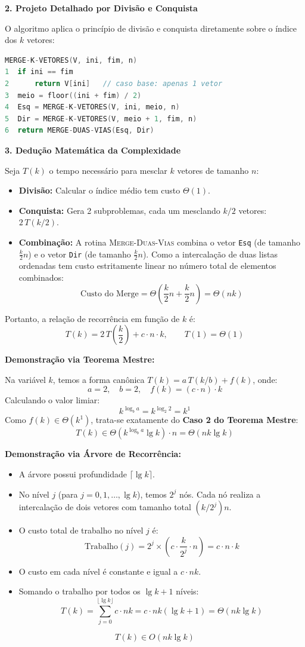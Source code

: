 \documentclass[11pt,a4paper]{article}
\newcommand{\res}[1]{\[\boxed{#1}\]}
\newcommand{\topico}[1]{\par\medskip\textbf{\color{azul}#1}\par}
\newcommand{\subtopico}[1]{\par\smallskip\textbf{#1}\par}
\begin{document}
\topico{2. Projeto Detalhado por Divisão e Conquista}
O algoritmo aplica o princípio de divisão e conquista diretamente sobre o índice dos $k$ vetores:

\begin{lstlisting}[language=C]
MERGE-K-VETORES(V, ini, fim, n)
1  if ini == fim
2      return V[ini]   // caso base: apenas 1 vetor
3  meio = floor((ini + fim) / 2)
4  Esq = MERGE-K-VETORES(V, ini, meio, n)
5  Dir = MERGE-K-VETORES(V, meio + 1, fim, n)
6  return MERGE-DUAS-VIAS(Esq, Dir)
\end{lstlisting}

\topico{3. Dedução Matemática da Complexidade}
Seja $T(k)$ o tempo necessário para mesclar $k$ vetores de tamanho $n$:
\begin{itemize}
  \item \textbf{Divisão:} Calcular o índice médio tem custo $\Theta(1)$.
  \item \textbf{Conquista:} Gera 2 subproblemas, cada um mesclando $k/2$ vetores: $2\,T(k/2)$.
  \item \textbf{Combinação:} A rotina \textsc{Merge-Duas-Vias} combina o vetor \texttt{Esq} (de tamanho $\frac{k}{2}n$) e o vetor \texttt{Dir} (de tamanho $\frac{k}{2}n$). Como a intercalação de duas listas ordenadas tem custo estritamente linear no número total de elementos combinados:
  \[
  \text{Custo do Merge} = \Theta\left(\frac{k}{2}n + \frac{k}{2}n\right) = \Theta(nk)
  \]
\end{itemize}
Portanto, a relação de recorrência em função de $k$ é:
\[
T(k) = 2\,T\left(\frac{k}{2}\right) + c \cdot n \cdot k, \qquad T(1) = \Theta(1)
\]

\subtopico{Demonstração via Teorema Mestre:}
Na variável $k$, temos a forma canônica $T(k) = a\,T(k/b) + f(k)$, onde:
\[
a = 2, \quad b = 2, \quad f(k) = (c \cdot n) \cdot k
\]
Calculando o valor limiar:
\[
k^{\log_b a} = k^{\log_2 2} = k^1
\]
Como $f(k) \in \Theta(k^1)$, trata-se exatamente do \textbf{Caso 2 do Teorema Mestre}:
\[
T(k) \in \Theta(k^{\log_b a} \lg k) \cdot n = \Theta(nk \lg k)
\]

\subtopico{Demonstração via Árvore de Recorrência:}
\begin{itemize}
  \item A árvore possui profundidade $\lceil \lg k \rceil$.
  \item No nível $j$ (para $j = 0, 1, \dots, \lg k$), temos $2^j$ nós. Cada nó realiza a intercalação de dois vetores com tamanho total $(k / 2^j)n$.
  \item O custo total de trabalho no nível $j$ é:
  \[
  \text{Trabalho}(j) = 2^j \times \left( c \cdot \frac{k}{2^j} \cdot n \right) = c \cdot n \cdot k
  \]
  \item O custo em cada nível é constante e igual a $c \cdot nk$.
  \item Somando o trabalho por todos os $\lg k + 1$ níveis:
  \[
  T(k) = \sum_{j=0}^{\lfloor \lg k \rfloor} c \cdot n k = c \cdot n k (\lg k + 1) = \Theta(nk \lg k)
  \]
\end{itemize}
\res{T(k) \in O(nk \lg k)}
\end{document}
